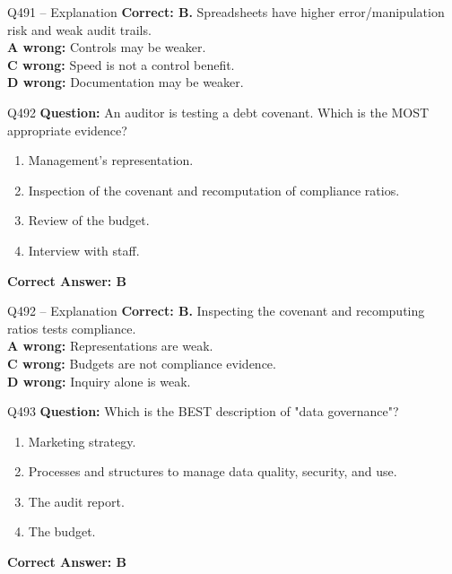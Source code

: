 \documentclass[aspectratio=169,10pt]{beamer}
\begin{document}
	\begin{frame}[t]{Q491 -- Explanation}
		\small
		\textbf{Correct: B.} Spreadsheets have higher error/manipulation risk and weak audit trails. \\[4pt]
		\textbf{A wrong:} Controls may be weaker. \\[2pt]
		\textbf{C wrong:} Speed is not a control benefit. \\[2pt]
		\textbf{D wrong:} Documentation may be weaker.
	\end{frame}
	
	\begin{frame}[t]{Q492}
		\small
		\textbf{Question:} An auditor is testing a debt covenant. Which is the MOST appropriate evidence?
		\begin{enumerate}[label=\Alph*.,itemsep=1pt,topsep=2pt]
			\item Management's representation.
			\item Inspection of the covenant and recomputation of compliance ratios.
			\item Review of the budget.
			\item Interview with staff.
		\end{enumerate}
		\vspace{4pt}
		\textbf{Correct Answer: B}
	\end{frame}
	
	\begin{frame}[t]{Q492 -- Explanation}
		\small
		\textbf{Correct: B.} Inspecting the covenant and recomputing ratios tests compliance. \\[4pt]
		\textbf{A wrong:} Representations are weak. \\[2pt]
		\textbf{C wrong:} Budgets are not compliance evidence. \\[2pt]
		\textbf{D wrong:} Inquiry alone is weak.
	\end{frame}
	
	\begin{frame}[t]{Q493}
		\small
		\textbf{Question:} Which is the BEST description of "data governance"?
		\begin{enumerate}[label=\Alph*.,itemsep=1pt,topsep=2pt]
			\item Marketing strategy.
			\item Processes and structures to manage data quality, security, and use.
			\item The audit report.
			\item The budget.
		\end{enumerate}
		\vspace{4pt}
		\textbf{Correct Answer: B}
	\end{frame}
	
\end{document}
